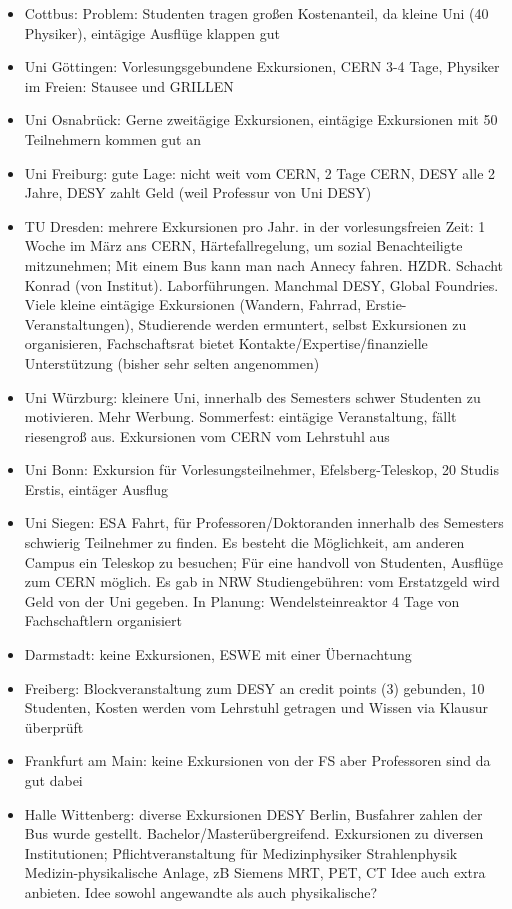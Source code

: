 \begin{itemize}
        \item Cottbus: Problem: Studenten tragen großen Kostenanteil, da kleine Uni (40 Physiker), eintägige Ausflüge klappen gut
        \item Uni Göttingen:
        Vorlesungsgebundene Exkursionen, CERN 3-4 Tage, Physiker im Freien: Stausee und GRILLEN
        \item Uni Osnabrück:
        Gerne zweitägige Exkursionen, eintägige Exkursionen mit 50 Teilnehmern kommen gut an
        \item Uni Freiburg:
        gute Lage: nicht weit vom CERN, 2 Tage CERN, DESY alle 2 Jahre, DESY zahlt Geld (weil Professur von Uni DESY)
        \item TU Dresden:
        mehrere Exkursionen pro Jahr. in der vorlesungsfreien Zeit: 1 Woche im März ans CERN, Härtefallregelung, um sozial Benachteiligte mitzunehmen; Mit einem Bus kann man nach Annecy fahren. HZDR. Schacht Konrad (von Institut). Laborführungen. Manchmal DESY, Global Foundries. Viele kleine eintägige Exkursionen (Wandern, Fahrrad, Erstie-Veranstaltungen), Studierende werden ermuntert, selbst Exkursionen zu organisieren, Fachschaftsrat bietet Kontakte/Expertise/finanzielle Unterstützung
        (bisher sehr selten angenommen)
        \item Uni Würzburg:
        kleinere Uni, innerhalb des Semesters schwer Studenten zu motivieren. Mehr Werbung. Sommerfest: eintägige Veranstaltung, fällt riesengroß aus. Exkursionen vom CERN vom Lehrstuhl aus
        \item Uni Bonn:
        Exkursion für Vorlesungsteilnehmer, Efelsberg-Teleskop, 20 Studis Erstis, eintäger Ausflug
        \item Uni Siegen:
        ESA Fahrt, für Professoren/Doktoranden innerhalb des Semesters schwierig Teilnehmer zu finden. Es besteht die Möglichkeit, am anderen Campus ein Teleskop zu besuchen; Für eine handvoll von Studenten, Ausflüge zum CERN möglich. Es gab in NRW Studiengebühren: vom Erstatzgeld wird Geld von der Uni gegeben. In Planung: Wendelsteinreaktor 4 Tage von Fachschaftlern organisiert
        \item Darmstadt:
        keine Exkursionen, ESWE mit einer Übernachtung
        \item Freiberg:
        Blockveranstaltung zum DESY an credit points (3) gebunden, 10 Studenten, Kosten werden vom Lehrstuhl getragen und Wissen via Klausur überprüft
        \item Frankfurt am Main:
        keine Exkursionen von der FS aber Professoren sind da gut dabei
        \item Halle Wittenberg:
        diverse Exkursionen DESY Berlin, Busfahrer zahlen der Bus wurde gestellt. Bachelor/Masterübergreifend. Exkursionen zu diversen Institutionen; Pflichtveranstaltung für Medizinphysiker Strahlenphysik Medizin-physikalische Anlage, zB Siemens MRT, PET, CT Idee auch extra anbieten. Idee sowohl angewandte als auch physikalische?
      \end{itemize}


